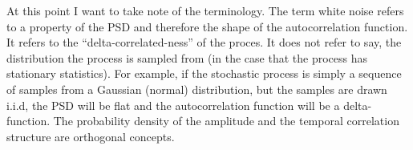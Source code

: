 \documentclass{article}
\begin{document}
At this point I want to take note of the terminology. The term white noise refers to a property of the PSD and therefore the shape of the autocorrelation function. It refers to the ``delta-correlated-ness'' of the proces. It does not refer to say, the distribution the process is sampled from (in the case that the process has stationary statistics). For example, if the stochastic process is simply a sequence of samples from a Gaussian (normal) distribution, but the samples are drawn i.i.d, the PSD will be flat and the autocorrelation function will be a delta-function. The probability density of the amplitude and the temporal correlation structure are orthogonal concepts.
\end{document}
